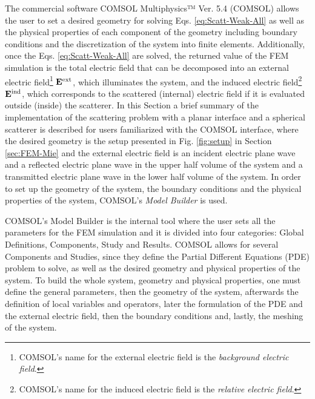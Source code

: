 
The commercial software COMSOL Multiphysics™ Ver. 5.4 (COMSOL) allows the user to set a desired geometry for solving Eqs. \eqref{eq:Scatt-Weak-All} as well as the physical properties of each component of the geometry including boundary conditions and the discretization of the system into finite elements.  Additionally, once the Eqs. \eqref{eq:Scatt-Weak-All} are solved, the returned value of the FEM simulation is the total electric field that can be decomposed into an external electric field\footnote{COMSOL's name for the external electric field is the \textit{background electric field}.} $\vb{E}^\text{ext}$, which illuminates the system, and the induced electric field\footnote{COMSOL's name for the induced electric field is the \textit{relative electric field}.} $\vb{E}^\text{ind}$, which corresponds to the scattered (internal) electric field if it is evaluated outside (inside) the scatterer. In this Section a brief summary of the implementation of the scattering  problem with a planar interface and a spherical scatterer is described for users familiarized with the COMSOL interface, where the desired geometry is the setup presented in Fig. \ref{fig:setup} in Section \ref{sec:FEM-Mie} and the external electric field is an incident electric plane wave and a reflected electric plane wave in the upper half volume of the system and a transmitted electric plane wave in the lower half volume of the system. In order to set up the geometry of the system, the boundary conditions and the physical properties of the system, COMSOL's  \textit{Model Builder}  is used.

COMSOL's Model Builder is the internal tool where the user sets all the parameters for the FEM simulation and it is divided into four categories:  Global Definitions, Components, Study and Results. COMSOL allows for several Components and Studies, since they define the Partial Different Equations (PDE) problem to solve, as well as the desired geometry and  physical properties of the system. To build the whole system, geometry and physical properties, one must define the general parameters, then the geometry of the system, afterwards the definition of local variables and operators, later the formulation of the PDE and the external electric field,  then the boundary conditions and, lastly, the meshing of the system.

